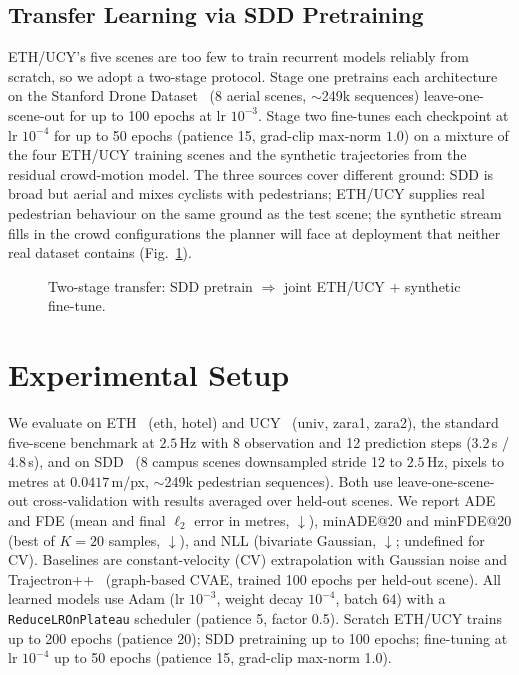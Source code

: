 \documentclass[conference]{IEEEtran}
\begin{document}
\subsection{Transfer Learning via SDD Pretraining}
\label{sec:transfer}

ETH/UCY's five scenes are too few to train recurrent models reliably
from scratch, so we adopt a two-stage protocol.  Stage one pretrains
each architecture on the Stanford Drone
Dataset~\cite{robicquet2016learning} (8 aerial scenes,
$\sim$249k sequences) leave-one-scene-out for up to 100 epochs at lr
$10^{-3}$.  Stage two fine-tunes each checkpoint at lr $10^{-4}$ for
up to 50 epochs (patience 15, grad-clip max-norm $1.0$) on a mixture
of the four ETH/UCY training scenes and the synthetic trajectories
from the residual crowd-motion model.  The three sources cover
different ground: SDD is broad but aerial and mixes cyclists with
pedestrians; ETH/UCY supplies real pedestrian behaviour on the same
ground as the test scene; the synthetic stream fills in the crowd
configurations the planner will face at deployment that neither real
dataset contains (Fig.~\ref{fig:finetune}).

\begin{figure}[t]
  \centering
  \resizebox{0.6\columnwidth}{!}{}
  \caption{Two-stage transfer: SDD pretrain $\Rightarrow$ joint
           ETH/UCY $+$ synthetic fine-tune.}
  \label{fig:finetune}
\end{figure}

\section{Experimental Setup}

We evaluate on ETH~\cite{pellegrini2009you} (eth, hotel) and
UCY~\cite{lerner2007crowds} (univ, zara1, zara2), the standard
five-scene benchmark at $2.5$\,Hz with 8 observation and 12 prediction
steps (3.2\,s / 4.8\,s), and on
SDD~\cite{robicquet2016learning} (8 campus scenes downsampled stride 12
to $2.5$\,Hz, pixels to metres at $0.0417$\,m/px, $\sim$249k pedestrian
sequences).  Both use leave-one-scene-out cross-validation with results
averaged over held-out scenes.  We report ADE and FDE (mean and final
$\ell_2$ error in metres, $\downarrow$), minADE@20 and minFDE@20 (best
of $K{=}20$ samples, $\downarrow$), and NLL (bivariate Gaussian,
$\downarrow$; undefined for CV).  Baselines are constant-velocity (CV)
extrapolation with Gaussian noise and
Trajectron++~\cite{salzmann2020trajectron} (graph-based CVAE, trained
100 epochs per held-out scene).  All learned models use Adam
(lr $10^{-3}$, weight decay $10^{-4}$, batch 64) with a
\texttt{ReduceLROnPlateau} scheduler (patience 5, factor 0.5).  Scratch
ETH/UCY trains up to 200 epochs (patience 20); SDD pretraining up to
100 epochs; fine-tuning at lr $10^{-4}$ up to 50 epochs (patience 15,
grad-clip max-norm 1.0).
\end{document}
